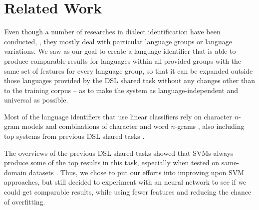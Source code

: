 \section{Related Work}\label{relwork}






Even though a number of researches in dialect identification have been conducted, \parencite[among many others]{tiedemann-ljubesic:2012:COLING,lui2013classifying,maier2014language,ljubesic2015discriminating}, they mostly deal with particular language groups or language variations. We saw as our goal to create a language identifier that is able to produce comparable results for languages within all provided groups with the same set of features for every language group, so that it can be expanded outside those languages provided by the DSL shared task without any changes other than to the training corpus -- as to make the system as language-independent and universal as possible.

Most of the language identifiers that use linear classifiers rely on character $n$-gram models \parencite{carter2011semi,ng2011improving,zampieri2012automatic} and combinations of character and word $n$-grams \parencite{milne2012study,vogel2012robust,goldszmidt2013boot}, also including top systems from previous DSL shared tasks \parencite{goutte-leger:2015:LT4VarDial,malmasi-dras:2015:LT4VarDial,ccoltekin-rama:2016:VarDial3}.

The overviews of the previous DSL shared tasks \parencite{zampieri:2014:VarDial,zampieri:2015:LT4VarDial,dslrec:2016} showed that SVMs always produce some of the top results in this task, especially when tested on same-domain datasets \parencite{ccoltekin-rama:2016:VarDial3}. Thus, we chose to put our efforts into improving upon SVM approaches, but still decided to experiment with an neural network to see if we could get comparable results, while using fewer features and reducing the chance of overfitting.

